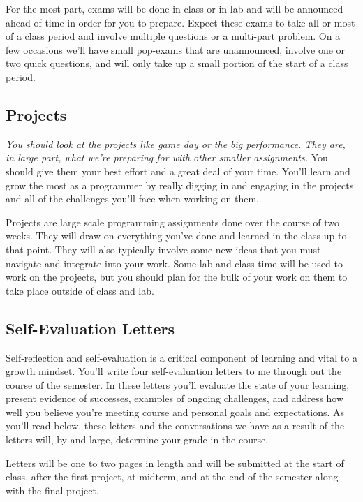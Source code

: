 \documentclass[10pt]{article}
\begin{document}
For the most part, exams will be done in class or in lab and will be announced ahead of time in order for you to prepare.  Expect these exams to take all or most of a class period and involve multiple questions or a multi-part problem. On a few occasions we'll have small pop-exams that are unannounced, involve one or two quick questions, and will only take up a small portion of the start of a class period.

\subsection*{Projects}

\textit{You should look at the projects like game day or the big performance. They are, in large part, what we're preparing for with other smaller assignments.} You should give them your best effort and a great deal of your time. You'll learn and grow the most as a programmer by really digging in and engaging in the projects and all of the challenges you'll face when working on them.

Projects are large scale programming assignments done over the course of two weeks. They will draw on everything you've done and learned in the class up to that point. They will also typically involve some new ideas that you must navigate and integrate into your work. Some lab and class time will be used to work on the projects, but you should plan for the bulk of your work on them to take place outside of class and lab.

\subsection*{Self-Evaluation Letters}

Self-reflection and self-evaluation is a critical component of learning and vital to a growth mindset. You'll write four self-evaluation letters to me through out the course of the semester. In these letters you'll evaluate the state of your learning, present evidence of successes, examples of ongoing challenges, and address how well you believe you're meeting course and personal goals and expectations. As you'll read below, these letters and the conversations we have as a result of the letters will, by and large, determine your grade in the course.

Letters will be one to two pages in length and will be submitted at the start of class, after the first project, at midterm, and at the end of the semester along with the final project.
\end{document}
